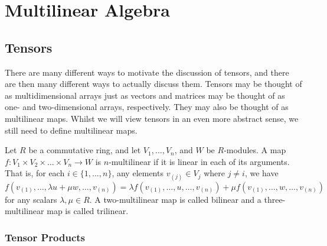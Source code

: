 \documentclass[a4paper,12pt]{article}
\begin{document}
\pagebreak

\section{Multilinear Algebra}\label{sec:multilinear_algebra}

\subsection{Tensors}\label{subsec:multilinear_algebra:tensors}

There are many different ways to motivate the discussion of tensors, and there are then many different ways to actually discuss them.
Tensors may be thought of as multidimensional arrays just as vectors and matrices may be thought of as one- and two-dimensional arrays, respectively.
They may also be thought of as multilinear maps.
Whilst we will view tensors in an even more abstract sense, we still need to define multilinear maps.
\begin{definition}\label{def:multilinear_map}
Let $R$ be a commutative ring, and let $V_1, \dots, V_n$, and $W$ be $R$-modules.
A map $f \colon V_1 \times V_2 \times \dots \times V_n \to W$ is $n$-multilinear if it is linear in each of its arguments.
That is, for each $i \in \{1, \dots, n\}$, any elements $v_{(j)} \in V_j$ where $j \neq i$, we have
\begin{equation}
    f(v_{(1)}, \ldots, \lambda u + \mu w, \ldots, v_{(n)}) = \lambda f(v_{(1)}, \ldots, u, \ldots, v_{(n)}) + \mu f(v_{(1)}, \ldots, w, \ldots, v_{(n)})
\end{equation}
for any scalars $\lambda, \mu \in R$.
A two-multilinear map is called bilinear and a three-multilinear map is called trilinear.
\end{definition}

\subsubsection{Tensor Products}\label{subsubsec:multilinear_algebra:tensors:tensor_products}
\end{document}
